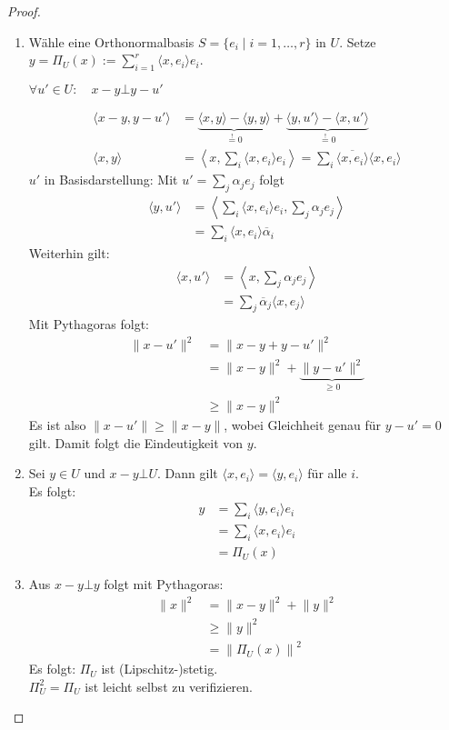 \documentclass[parskip,a4paper,twoside,DIV15,BCOR12mm]{scrbook}
\begin{document}
\begin{proof}
\begin{enumerate}
\item Wähle eine Orthonormalbasis \(S=\{e_{i}\mid i=1,\ldots,r\}\) in \(U\).
Setze \(y=\Pi_{U}(x):=\sum_{i=1}^{r}\langle x,e_{i}\rangle e_{i}\).
\begin{thesis}
\(\forall u'\in U:\quad x-y\bot y-u'\)
\end{thesis}
\begin{align*}
\langle x-y,y-u'\rangle&=\underbrace{\langle x,y\rangle-\langle y,y\rangle}_{\overset{!}{=}0}+\underbrace{\langle y,u'\rangle-\langle x,u'\rangle}_{\overset{!}{=}0}\\
\langle x,y\rangle&=\left\langle x,\sum_{i}{\langle x,e_{i}\rangle e_{i}}\right\rangle
    =\sum_{i}{\overline{\langle x,e_{i}\rangle}\langle x,e_{i}\rangle}
\end{align*}
\(u'\) in Basisdarstellung: Mit \(u'=\sum_{j}{\alpha_{j}e_{j}}\) folgt
\begin{align*}
\langle y,u'\rangle&=\left\langle\sum_{i}{\langle x,e_{i}\rangle e_{i}},\sum_{j}{\alpha_{j}e_{j}}\right\rangle\\
&=\sum_{i}{\langle x,e_{i}\rangle\overline{\alpha}_{i}}
\end{align*}
Weiterhin gilt:
\begin{align*}
\langle x,u'\rangle&=\left\langle x,\sum_{j}{\alpha_{j}e_{j}}\right\rangle\\
&=\sum_{j}{\overline{\alpha}_{j}\langle x,e_{j}\rangle}
\end{align*}
Mit Pythagoras folgt:
\begin{align*}
\lVert x-u'\rVert^{2}&=\lVert x-y+y-u'\rVert^{2}\\
&=\lVert x-y\rVert^{2}+\underbrace{\lVert y-u'\rVert^{2}}_{\geq0}\\
&\geq\lVert x-y\rVert^{2}
\end{align*}
Es ist also \(\lVert x-u'\rVert\geq\lVert x-y\rVert\), wobei Gleichheit genau
für \(y-u'=0\) gilt. Damit folgt die Eindeutigkeit von \(y\).
\item Sei \(y\in U\) und \(x-y\bot U\). Dann gilt 
\(\langle x,e_{i}\rangle=\langle y,e_{i}\rangle\) für alle \(i\).\\
Es folgt:
\begin{align*}
y&=\sum_{i}{\langle y,e_{i}\rangle e_{i}}\\
&=\sum_{i}{\langle x,e_{i}\rangle e_{i}}\\
&=\Pi_{U}(x)
\end{align*}
\item Aus \(x-y\bot y\) folgt mit Pythagoras:
\begin{align*}
\lVert x\rVert^{2}&=\lVert x-y\rVert^{2}+\lVert y\rVert^{2}\\
&\geq\lVert y\rVert^{2}\\
&=\left\lVert\Pi_{U}(x)\right\rVert^{2}
\end{align*}
Es folgt: \(\Pi_{U}\) ist (Lipschitz-)stetig.\\
\(\Pi_{U}^{2}=\Pi_{U}\) ist leicht selbst zu verifizieren.
\end{enumerate}
\end{proof}
\end{document}
